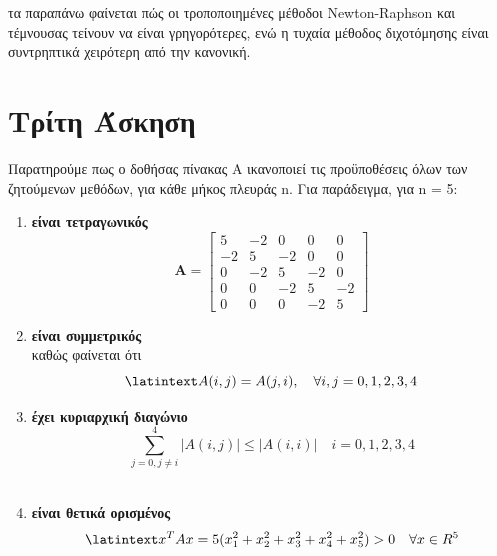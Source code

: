 \documentclass{article}
\newcommand{\lt}{\latintext}
\newcommand{\gt}{\greektext}
\begin{document}
 τα παραπάνω φαίνεται πώς οι τροποποιημένες μέθοδοι \lt Newton-Raphson \gt και τέμνουσας
\gt τείνουν να είναι γρηγορότερες, ενώ η τυχαία μέθοδος διχοτόμησης είναι συντρηπτικά χειρότερη
\gt από την κανονική.

\newpage
\section{\gt Τρίτη Άσκηση}
\gt Παρατηρούμε πως ο δοθήσας πίνακας Α ικανοποιεί τις προϋποθέσεις όλων των ζητούμενων μεθόδων,
\gt για κάθε μήκος πλευράς \lt n. \gt Για παράδειγμα, για \lt n = 5:
\begin{enumerate}
    \item \textbf{\gt είναι τετραγωνικός}
    \begin{equation*}
        \textbf{A} = 
        \begin{bmatrix}
            5 & -2 & 0 & 0 & 0\\
            -2 & 5 & -2 & 0 & 0\\
            0 & -2 & 5 & -2 & 0\\
            0 & 0 & -2 & 5 & -2\\
            0 & 0 & 0 & -2 & 5
        \end{bmatrix}
    \end{equation*}
    \item \textbf{\gt είναι συμμετρικός}\\
            \gt καθώς φαίνεται ότι
            \begin{equation*}
               \lt  A(i,j) = A(j, i), \quad \forall i,j = 0,1,2,3,4\\
            \end{equation*}
    \item \textbf{\gt έχει κυριαρχική διαγώνιο}\\
            \begin{equation*}
                \sum_{j=0,j \neq i}^{4}\left|A(i,j)\right| \leq \left|A(i,i)\right|
                \quad i=0,1,2,3,4
            \end{equation*}\\
    \item \textbf{\gt είναι θετικά ορισμένος}
            \begin{equation*}
                \lt x^{T}Ax = 5(x_1^{2} + x_2^{2} + x_3^{2} + x_4^{2} + x_5^{2}) > 0
                \quad \forall x \in R^{5}
            \end{equation*}
\end{enumerate}
\end{document}
